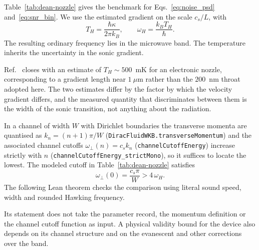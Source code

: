 \documentclass[aps,prd,reprint,nofootinbib,superscriptaddress]{revtex4-2}
\begin{document}
Table~\ref{tab:dean-nozzle} gives the benchmark for
Eqs.~\eqref{eq:noise_psd} and~\eqref{eq:snr_bin}. We use the estimated
gradient on the scale $c_s/L$, with
\begin{equation}
T_H = \frac{\hbar\kappa}{2\pi k_B},
\qquad
\omega_H = \frac{k_BT_H}{\hbar}.
\end{equation}
The resulting ordinary frequency lies in the microwave band. The
temperature inherits the uncertainty in the sonic gradient.

\begin{table}[t]
\centering

\caption{Adopted Dean bilayer-nozzle inputs and benchmark calculations.
The temperature, frequencies and ideal noise use the current spectral
model. The envelope rows evaluate supplied scalings at $\omega_H$.}
\label{tab:dean-nozzle}
\end{table}

Ref.~\cite{Geurs2025} closes with an estimate of
$T_H \sim 500$~mK for an electronic nozzle, corresponding to a gradient
length near $1~\mu$m rather than the $200$~nm throat adopted here. The
two estimates differ by the factor by which the velocity gradient
differs, and the measured quantity that discriminates between them is the
width of the sonic transition, not anything about the radiation.

In a channel of width $W$ with Dirichlet boundaries the transverse
momenta are quantised as $k_n = (n+1)\pi/W$
(\texttt{DiracFluidWKB.transverseMomentum}) and the associated channel
cutoffs $\omega_\perp(n) = c_s k_n$
(\texttt{channelCutoffEnergy}) increase strictly with $n$
(\texttt{channelCutoffEnergy\_strictMono}), so it suffices to locate the
lowest. The modeled cutoff in Table~\ref{tab:dean-nozzle} satisfies
\begin{equation}
\omega_\perp(0) = \frac{c_s\pi}{W} > 4\,\omega_H .
\label{eq:band_sep}
\end{equation}
The following Lean theorem checks the comparison using literal sound
speed, width and rounded Hawking frequency.
\begin{center}
\end{center}
Its statement does not take the parameter record, the momentum
definition or the channel cutoff function as input.
A physical validity bound for the device also depends on its channel
structure and on the evanescent and other corrections over the band.
\end{document}
